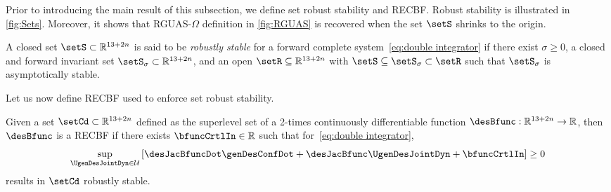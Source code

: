 Prior to introducing the main result of this subsection, we define set robust stability and RECBF. 
Robust stability is illustrated in \cref{fig:Sets}. Moreover, it shows that RGUAS-$\Omega$ definition in \cref{fig:RGUAS} is recovered when the set $\setS$ shrinks to the origin.  
\begin{definition}\label{def:RS-sigma}
	A closed set $\setS\subset\mathbb{R}^{13+2n}$  is said to be  \emph{robustly stable} for a forward complete system~\cref{eq:double integrator} if there exist 
	$\sigma\geq0$, a closed and forward invariant set $\setS_\sigma\subset\mathbb{R}^{13+2n}$, and an open $\setR\subseteq\mathbb{R}^{13+2n}$ with $\setS\subseteq\setS_\sigma\subset\setR$ such that $\setS_\sigma$ is asymptotically stable. %
\end{definition}
	Let us now define RECBF used to enforce set robust  stability. %
\begin{definition}\label{def:RECBF}
	Given a set $\setCd\subset\mathbb{R}^{13+2n}$ %
	defined as the superlevel set of a 2-times continuously differentiable function $\desBfunc:\mathbb{R}^{13+2n}\rightarrow\mathbb{R}$, then $\desBfunc$ is a RECBF if there exists $\bfuncCrtlIn\in\mathbb{R}$ such that for~\cref{eq:double integrator}, 
	\begin{equation}
		\label{eq:RECBF constraint}
		\underset{\UgenDesJointDyn\in {\cal U}}{\sup} \left[\desJacBfuncDot\genDesConfDot + \desJacBfunc \UgenDesJointDyn + \bfuncCrtlIn\right]\geq0
	\end{equation} 
	results in $\setCd$ robustly stable.%
\end{definition}

